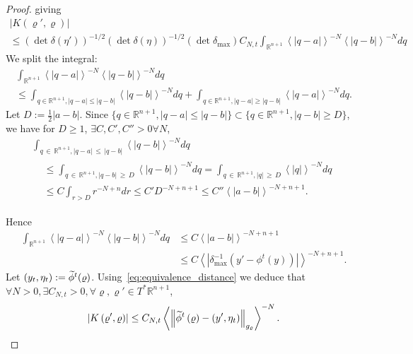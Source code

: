 \documentclass[AHL,Unicode,longabstracts,published]{cedram}
\newcommand{\bbR}{\mathbb{R}}
\let\oldtilde\tilde
\renewcommand*{\tilde}[1]{\mathchoice{\widetilde{#1}}{\widetilde{#1}}{\oldtilde{#1}}{\oldtilde{#1}}}
\let\oldexists\exists
\renewcommand*{\exists}{\mathrel{\oldexists}}
\let\oldforall\forall
\renewcommand*{\forall}{\mathrel{\oldforall}}
\newcommand{\bbR}{\mathbb{R}}
\begin{document}
\begin{proof}
giving
\begin{multline*}
\left|K\left(\varrho',\varrho\right)\right|\\\leq\left(\det \delta\left(\eta'\right)\right)^{-1/2}\left(\det \delta\left(\eta\right)\right)^{-1/2}\left(\det \delta_{\max}\right)C_{N,t}\int_{\bbR^{n+1}}\left\langle \left|q-a\right|\right\rangle ^{-N}\left\langle \left|q-b\right|\right\rangle ^{-N}dq
\end{multline*}
We split the integral:
\begin{multline*}
\int_{\bbR^{n+1}}\left\langle \left|q-a\right|\right\rangle ^{-N}\left\langle \left|q-b\right|\right\rangle ^{-N}dq\\
\leq\int_{q\in\bbR^{n+1},\left|q-a\right|\leq\left|q-b\right|} \left\langle \left|q-b\right|\right\rangle ^{-N}dq+\int_{q\in\bbR^{n+1},\left|q-a\right|\geq\left|q-b\right|}\left\langle \left|q-a\right|\right\rangle ^{-N}dq.
\end{multline*}
Let $D:=\frac{1}{2}|a-b|$. Since $\{ q\in\bbR^{n+1},|q-a|\leq|q-b|\} \subset\{ q\in\bbR^{n+1},|q-b|\geq D\}$, we have for $D\geq1$, $\exists C,C',C''>0\forall N$,
\begin{multline*}
\int_{q\,\in\,\bbR^{n+1},\left|q-a\right|\,\leq\,\left|q-b\right|}\left\langle \left|q-b\right|\right\rangle ^{-N}dq\\
\begin{aligned}
& \leq\int_{q\,\in\,\bbR^{n+1},\left|q-b\right|\,\geq\,D}\left\langle \left|q-b\right|\right\rangle ^{-N}dq=\int_{q\,\in\,\bbR^{n+1},\left|q\right|\,\geq\,D}\left\langle \left|q\right|\right\rangle ^{-N}dq\\
& \leq C\int_{r>D}r^{-N+n}dr\leq C'D^{-N+n+1}\leq C''\left\langle \left|a-b\right|\right\rangle ^{-N+n+1}.
\end{aligned}
\end{multline*}

Hence
\begin{align*}
\int_{\bbR^{n+1}}\left\langle \left|q-a\right|\right\rangle ^{-N}\left\langle \left|q-b\right|\right\rangle ^{-N}dq & \leq C\left\langle \left|a-b\right|\right\rangle ^{-N+n+1}\\
& \leq C\left\langle \left|\delta_{\max}^{-1}\left(y'-\phi^{t}\left(y\right)\right)\right|\right\rangle ^{-N+n+1}.
\end{align*}
Let $(y_{t},\eta_{t}):=\tilde{\phi}^{t}(\varrho)$. Using~\eqref{eq:equivalence_distance} we deduce that $\forall N>0,\exists C_{N,t}>0,\forall\varrho,\varrho'\in T^{*}\bbR^{n+1}$,
\begin{equation}\label{eq:K1}
\left|K\left(\varrho',\varrho\right)\right|\leq C_{N,t}\left\langle \left\Vert \tilde{\phi}^{t}\left(\varrho\right)-\left(y',\eta_{t}\right)\right\Vert _{g_{\varrho}}\right\rangle ^{-N}.
\end{equation}


\end{proof}
\end{document}

